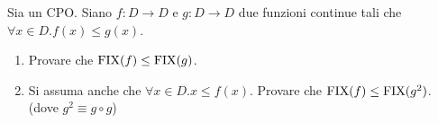 {
  Sia  un CPO. Siano $f: D \to D$ e $g: D \to D$ due funzioni
  continue tali che $\forall{x}\in D. f(x) \leq{} g(x)$.
  \begin{enumerate}
    \item Provare che $\textrm{\normalfont{FIX}}(f) \leq{} \textrm{\normalfont{FIX}}(g)$.
    \item Si assuma anche che $\forall{x}\in D.x \leq{} f(x)$. Provare che
      $\textrm{\normalfont{FIX}}(f) \leq \textrm{\normalfont{FIX}}(g^2)$. (dove $g^2 \equiv{} g \circ g$)
  \end{enumerate}
}
{}
